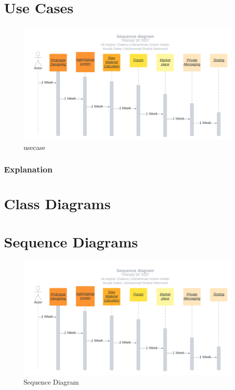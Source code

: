 \documentclass{article}
\begin{document}
\section*{Use Cases}
\centering
\begin{figure}[!h]
    \includegraphics[width=1\linewidth]{Sequence diagram.png}
    \caption{usecase}
    \label{fig:seq}
\end{figure}


\subsubsection*{Explanation}

\section*{Class Diagrams}

\section*{Sequence Diagrams}
\centering
\begin{figure}[!h]
    \includegraphics[width=1\linewidth]{Sequence diagram.png}
    \caption{Sequence Diagram}
    \label{fig:seq}
\end{figure}
\end{document}
